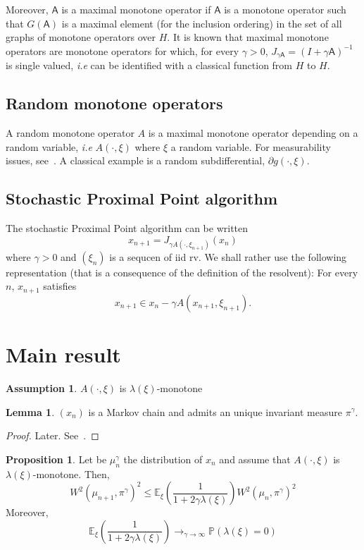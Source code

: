 \documentclass{article}
\newcommand{\1}{\mathbbm 1}
\newcommand{\bP}{{{\mathbb P}}}
\newcommand{\bE}{{{\mathbb E}}}
\newcommand{\sA}{{\mathsf A}}
\theoremstyle{definition}
\newtheorem{lemma}[theorem]{Lemma}
\newtheorem{proposition}[theorem]{Proposition}
\newtheorem{assumption}{Assumption}
\begin{document}
Moreover, $\sA$ is a maximal monotone operator if $\sA$ is a monotone operator such that $G(\sA)$ is a maximal element (for the inclusion ordering) in the set of all graphs of monotone operators over $H$. It is known that maximal monotone operators are monotone operators for which, for every $\gamma > 0$, $J_{\gamma \sA} = (I + \gamma \sA)^{-1}$ is single valued, \textit{i.e} can be identified with a classical function from $H$ to $H$.

\subsection{Random monotone operators}
A random monotone operator $A$ is a maximal monotone operator depending on a random variable, \textit{i.e} $A(\cdot,\xi)$ where $\xi$ a random variable. For measurability issues, see~\cite{bia-hac-16}. A classical example is a random subdifferential, $\partial g(\cdot,\xi)$. 
\subsection{Stochastic Proximal Point algorithm}

The stochastic Proximal Point algorithm can be written
\begin{equation}
\label{eq:spp}
    x_{n+1} = J_{\gamma A(\cdot,\xi_{n+1})}(x_n)
\end{equation}
where $\gamma >0$ and $(\xi_n)$ is a sequcen of iid rv.
We shall rather use the following representation (that is a consequence of the definition of the resolvent): For every $n$, $x_{n+1}$ satisfies
\begin{equation}
    x_{n+1} \in x_n - \gamma A(x_{n+1},\xi_{n+1}).
\end{equation}

\section{Main result}
\begin{assumption}
$A(\cdot,\xi)$ is $\lambda(\xi)$-monotone
\end{assumption}

\begin{lemma}
$(x_n)$ is a Markov chain and admits an unique invariant measure $\pi^\gamma$.
\end{lemma}
\begin{proof}
Later. See~\cite{duf-livre97}.
\end{proof}

\begin{proposition}
Let be $\mu_n^\gamma$ the distribution of $x_n$ and assume that $A(\cdot,\xi)$ is $\lambda(\xi)$-monotone. Then,
\begin{equation}
    W^2(\mu_{n+1},\pi^\gamma)^2 \leq \bE_\xi\left(\frac{1}{1+2\gamma\lambda(\xi)}\right) W^2(\mu_{n},\pi^\gamma)^2
\end{equation}
Moreover, \begin{equation}
    \label{eq:cvd}
    \bE_\xi\left(\frac{1}{1+2\gamma\lambda(\xi)}\right) \longrightarrow_{\gamma \to \infty} \bP(\lambda(\xi) = 0)
\end{equation} 
\end{proposition}
\end{document}
